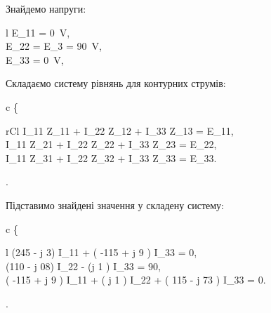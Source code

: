 \documentclass[a4paper,oneside,DIV=12,12pt]{scrartcl}
\begin{document}
			Знайдемо напруги:
			\begin{IEEEeqnarray*}{l}
				E_{11} = \SI{0}{\volt},\\
				E_{22} = E_3 = \SI{90}{\volt},\\
				E_{33} = \SI{0}{\volt},\\
			\end{IEEEeqnarray*}
			
			Складаємо систему рівнянь для контурних струмів:
			\begin{IEEEeqnarray*}{c}
				\left\{
					\begin{IEEEeqnarraybox}[
						\IEEEeqnarraystrutmode
						\IEEEeqnarraystrutsizeadd{2pt}{2pt}
					][c]{rCl}
						I_{11} \cdot Z_{11} + I_{22} \cdot Z_{12} + I_{33} \cdot Z_{13} = E_{11},\\
						I_{11} \cdot Z_{21} + I_{22} \cdot Z_{22} + I_{33} \cdot Z_{23} = E_{22},\\
						I_{11} \cdot Z_{31} + I_{22} \cdot Z_{32} + I_{33} \cdot Z_{33} = E_{33}.
					\end{IEEEeqnarraybox}
				\right.
			\end{IEEEeqnarray*}
			
			Підставимо знайдені значення у складену систему:
			\begin{IEEEeqnarray*}{c}
				\left\{
					\begin{IEEEeqnarraybox}[
						\IEEEeqnarraystrutmode
						\IEEEeqnarraystrutsizeadd{2pt}{2pt}
					][c]{l}
						\left(245 - j 3\right) \cdot I_{11} + \left( -115 + j 9 \right) \cdot I_{33} = 0,\\
						\left(110 - j 08\right) \cdot I_{22} -  \left(j 1 \right) \cdot I_{33} = 90,\\
						\left( -115 + j 9 \right) \cdot I_{11} + \left( j 1 \right) \cdot I_{22} + \left( 115 - j 73 \right) \cdot I_{33} = 0.
					\end{IEEEeqnarraybox}
				\right.
			\end{IEEEeqnarray*}
			
\end{document}

